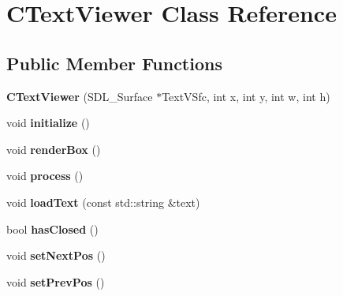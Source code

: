 \hypertarget{class_c_text_viewer}{
\section{CTextViewer Class Reference}
\label{class_c_text_viewer}
}
\subsection*{Public Member Functions}
\begin{DoxyCompactItemize}
\item 
\hypertarget{class_c_text_viewer_a3b1ca50f39afb907fcbd5cfbe834b5fb}{
{\bfseries CTextViewer} (SDL\_\-Surface $\ast$TextVSfc, int x, int y, int w, int h)}
\label{class_c_text_viewer_a3b1ca50f39afb907fcbd5cfbe834b5fb}

\item 
\hypertarget{class_c_text_viewer_a8bfc538f60f386f4291ffd2f56d4a556}{
void {\bfseries initialize} ()}
\label{class_c_text_viewer_a8bfc538f60f386f4291ffd2f56d4a556}

\item 
\hypertarget{class_c_text_viewer_aa926d5e0d54862efc6ccc9be07bb9d6a}{
void {\bfseries renderBox} ()}
\label{class_c_text_viewer_aa926d5e0d54862efc6ccc9be07bb9d6a}

\item 
\hypertarget{class_c_text_viewer_ad16b7b4c5b3668862d5720b780544349}{
void {\bfseries process} ()}
\label{class_c_text_viewer_ad16b7b4c5b3668862d5720b780544349}

\item 
\hypertarget{class_c_text_viewer_aeb190784bb702eaf5afa5ef03f8ebc94}{
void {\bfseries loadText} (const std::string \&text)}
\label{class_c_text_viewer_aeb190784bb702eaf5afa5ef03f8ebc94}

\item 
\hypertarget{class_c_text_viewer_aa69881b8e63d40ebbd72a6760cbcbcf3}{
bool {\bfseries hasClosed} ()}
\label{class_c_text_viewer_aa69881b8e63d40ebbd72a6760cbcbcf3}

\item 
\hypertarget{class_c_text_viewer_af25916be253bef6a822200e6e699da83}{
void {\bfseries setNextPos} ()}
\label{class_c_text_viewer_af25916be253bef6a822200e6e699da83}

\item 
\hypertarget{class_c_text_viewer_af7d9e452ce880901bb57a1b6539a6009}{
void {\bfseries setPrevPos} ()}
\label{class_c_text_viewer_af7d9e452ce880901bb57a1b6539a6009}


\end{DoxyCompactItemize}
